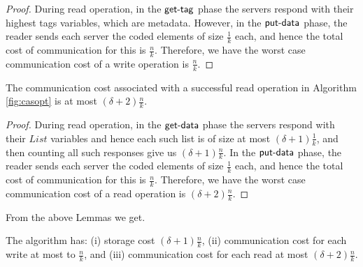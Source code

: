 \begin{proof}
  During read operation, in the $\act{get-tag}$ phase the servers respond with their highest tags variables, which are metadata. However, in the $\act{put-data}$ phase, the reader sends each server the  coded elements of size  $\frac{1}{k}$ each, and hence the total cost of communication for this is $\frac{n}{k}$. Therefore, we have the worst case communication cost of a write operation is $ \frac{n}{k}$.
\end{proof}

\begin{lemma} \label{radonc:read_cost}
	The communication cost associated with a successful read operation in Algorithm \ref{fig:casopt} is at most $(\delta +2)\frac{n}{k}$. 
\end{lemma}
\begin{proof}
  During read operation, in the $\act{get-data}$ phase the servers respond with their $List$ variables and hence each such list 
  is of size at most $(\delta +1)\frac{1}{k}$, and then counting all such responses give us $(\delta +1)\frac{n}{k}$.  In the $\act{put-data}$ phase, the reader sends each server the  coded elements of size  $\frac{1}{k}$ each, and hence the total cost of communication for this is $\frac{n}{k}$. Therefore, we have the worst case communication cost of a read operation is 
  $(\delta+2) \frac{n}{k}$.
\end{proof}

From the above Lemmas we get.

\begin{theorem}\label{treas:performance}
 The \ares{} algorithm has: (i) storage cost $(\delta +1 )\frac{n}{k}$, (ii) communication 
cost for each write at most to $\frac{n}{k}$, and (iii) communication 
cost for each read at most $(\delta +2)\frac{n}{k}$.
\end{theorem}
